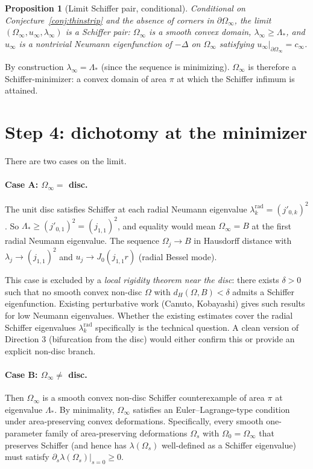 \documentclass[11pt]{article}
\newcommand{\Om}{\Omega}
\newcommand{\1}{\mathbf 1}
\newtheorem{prop}[lem]{Proposition}
\begin{document}
\begin{prop}[Limit Schiffer pair, conditional]\label{prop:limitpair}
Conditional on Conjecture~\ref{conj:thinstrip} and the absence of
corners in $\partial\Om_\infty$, the limit
$(\Om_\infty,u_\infty,\lambda_\infty)$ is a Schiffer pair: $\Om_\infty$
is a smooth convex domain, $\lambda_\infty\ge\Lambda_*$, and
$u_\infty$ is a nontrivial Neumann eigenfunction of $-\Delta$ on
$\Om_\infty$ satisfying $u_\infty|_{\partial\Om_\infty}=c_\infty$.
\end{prop}

By construction $\lambda_\infty=\Lambda_*$ (since the sequence is
minimizing). $\Om_\infty$ is therefore a Schiffer-minimizer: a convex
domain of area $\pi$ at which the Schiffer infimum is attained.

\section{Step 4: dichotomy at the minimizer}

There are two cases on the limit.

\paragraph{Case A: $\Om_\infty=$ disc.} The unit disc satisfies
Schiffer at each radial Neumann eigenvalue
$\lambda_k^{\mathrm{rad}}=(j'_{0,k})^2$. So $\Lambda_*\ge
(j'_{0,1})^2=(j_{1,1})^2$, and equality would mean $\Om_\infty=B$ at
the first radial Neumann eigenvalue. The sequence $\Om_j\to B$ in
Hausdorff distance with $\lambda_j\to(j_{1,1})^2$ and
$u_j\to J_0(j_{1,1}r)$ (radial Bessel mode).

This case is excluded by a \emph{local rigidity theorem near the
disc}: there exists $\delta>0$ such that no smooth convex
non-disc $\Om$ with $d_H(\Om,B)<\delta$ admits a Schiffer
eigenfunction. Existing perturbative work (Canuto, Kobayashi) gives
such results for low Neumann eigenvalues. Whether the existing
estimates cover the radial Schiffer eigenvalues
$\lambda_k^{\mathrm{rad}}$ specifically is the technical question. A
clean version of Direction 3 (bifurcation from the disc) would
either confirm this or provide an explicit non-disc branch.

\paragraph{Case B: $\Om_\infty\ne$ disc.} Then $\Om_\infty$ is a
smooth convex non-disc Schiffer counterexample of area $\pi$ at
eigenvalue $\Lambda_*$. By minimality, $\Om_\infty$ satisfies an
Euler--Lagrange-type condition under area-preserving convex
deformations. Specifically, every smooth one-parameter family of
area-preserving deformations $\Om_s$ with $\Om_0=\Om_\infty$ that
preserves Schiffer (and hence has $\lambda(\Om_s)$ well-defined as a
Schiffer eigenvalue) must satisfy
\(
    \partial_s\lambda(\Om_s)\big|_{s=0}\ge 0.
\)
\end{document}
